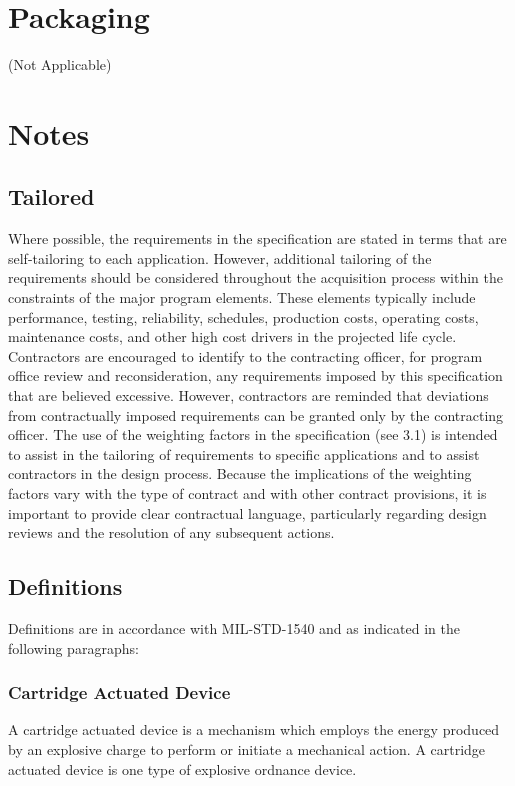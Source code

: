 \documentclass[12pt]{article}
\begin{document}
\section{Packaging} (Not Applicable)

\section{Notes}

\subsection{Tailored}
Where possible, the requirements in the specification are stated in terms that are self-tailoring to each application. 
However, additional tailoring of the requirements should be considered throughout the acquisition process within the constraints of the major program elements. 
These elements typically include performance, testing, reliability, schedules, production costs, operating costs, maintenance costs, and other high cost drivers in the projected life cycle. 
Contractors are encouraged to identify to the contracting officer, for program office review and reconsideration, any requirements imposed by this specification that are believed excessive. 
However, contractors are reminded that deviations from contractually imposed requirements can be granted only by the contracting officer. 
The use of the weighting factors in the specification (see 3.1) is intended to assist in the tailoring of requirements to specific applications and to assist contractors in the design process. 
Because the implications of the weighting factors vary with the type of contract and with other contract provisions, it is important to provide clear contractual language, particularly regarding design reviews and the resolution of any subsequent actions.

\subsection{Definitions}
Definitions are in accordance with MIL-STD-1540 and as indicated in the following paragraphs:

\subsubsection{Cartridge Actuated Device}
A cartridge actuated device is a mechanism which employs the energy produced by an explosive charge to perform or initiate a mechanical action. 
A cartridge actuated device is one type of explosive ordnance device.
\end{document}
